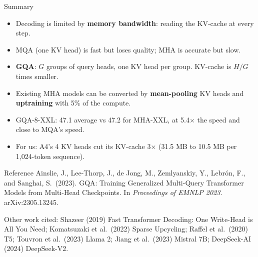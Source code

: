 \documentclass[aspectratio=169,11pt]{beamer}
\begin{document}
\begin{frame}{Summary}
  \begin{itemize}
    \item Decoding is limited by \textbf{memory bandwidth}: reading the KV-cache at every step.
    \item MQA (one KV head) is fast but loses quality; MHA is accurate but slow.
    \item \textbf{GQA}: $G$ groups of query heads, one KV head per group. KV-cache is $H/G$ times smaller.
    \item Existing MHA models can be converted by \textbf{mean-pooling} KV heads and \textbf{uptraining} with 5\% of the compute.
    \item GQA-8-XXL: 47.1 average vs 47.2 for MHA-XXL, at 5.4$\times$ the speed and close to MQA's speed.
    \item For us: A4's 4 KV heads cut its KV-cache 3$\times$ (31.5 MB to 10.5 MB per 1,024-token sequence).
  \end{itemize}
\end{frame}

\begin{frame}{Reference}
  \small
  Ainslie, J., Lee-Thorp, J., de Jong, M., Zemlyanskiy, Y., Lebrón, F., and Sanghai, S.\ (2023). GQA: Training Generalized Multi-Query Transformer Models from Multi-Head Checkpoints. In \emph{Proceedings of EMNLP 2023}. arXiv:2305.13245.
  \vspace{3mm}

  {\footnotesize Other work cited: Shazeer (2019) Fast Transformer Decoding: One Write-Head is All You Need; Komatsuzaki et al.\ (2022) Sparse Upcycling; Raffel et al.\ (2020) T5; Touvron et al.\ (2023) Llama 2; Jiang et al.\ (2023) Mistral 7B; DeepSeek-AI (2024) DeepSeek-V2.}
\end{frame}
\end{document}
